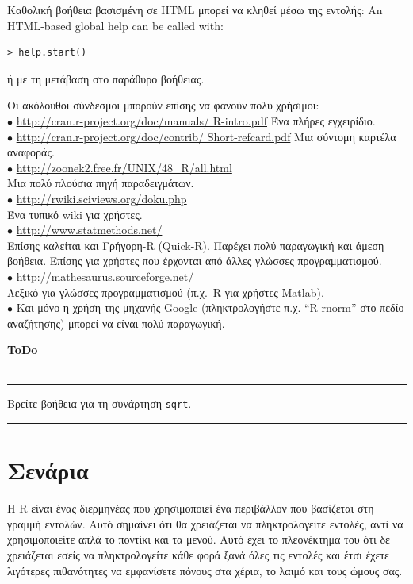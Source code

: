 \documentclass[a4paper,10pt,twocolumn]{article}
\newenvironment{ToDo} {
  \begin{flushright}
    \hfill
    \begin{minipage}{0.9\columnwidth}
    \textsf{\textbf{ToDo}} \\
      \vspace{-0.7cm}\\
      {\color{Gray}\rule[-0.05cm]{\columnwidth}{1.5pt}}} {
      {\color{Gray}\rule[0.3cm]{\columnwidth}{1.5pt}}
    \end{minipage}
    \vspace{0.3cm}
  \end{flushright}
  }
\begin{document}
Καθολική βοήθεια βασισμένη σε HTML μπορεί να κληθεί μέσω της εντολής:
An HTML-based global help can be called with:
\begin{Verbatim}[frame=single,gobble=0]
> help.start()
\end{Verbatim}
ή με τη μετάβαση στο παράθυρο βοήθειας.

Οι ακόλουθοι σύνδεσμοι μπορούν επίσης να φανούν πολύ χρήσιμοι:\\
\noindent $\bullet$ \url{http://cran.r-project.org/doc/manuals/ R-intro.pdf} Ένα πλήρες εγχειρίδιο.\\
\noindent $\bullet$ \url{http://cran.r-project.org/doc/contrib/ Short-refcard.pdf} Μια σύντομη καρτέλα
αναφοράς.\\
\noindent $\bullet$  \url{http://zoonek2.free.fr/UNIX/48\_R/all.html}\\
  Μια πολύ πλούσια πηγή παραδειγμάτων.\\
\noindent $\bullet$  \url{http://rwiki.sciviews.org/doku.php}\\
  Ένα τυπικό wiki για χρήστες.\\
\noindent $\bullet$ \url{http://www.statmethods.net/}\\
    Επίσης καλείται και Γρήγορη-R (Quick-R). Παρέχει πολύ παραγωγική και άμεση βοήθεια. Επίσης για χρήστες
    που έρχονται από άλλες γλώσσες προγραμματισμού. \\
    \noindent $\bullet$ \url{http://mathesaurus.sourceforge.net/}\\
    Λεξικό για γλώσσες προγραμματισμού (π.χ.~R για χρήστες Matlab). \\
\noindent $\bullet$  Και μόνο η χρήση της μηχανής Google (πληκτρολογήστε π.χ. ``R rnorm'' στο πεδίο αναζήτησης)
μπορεί να είναι πολύ παραγωγική.\\

\begin{ToDo}
Βρείτε βοήθεια για τη συνάρτηση \texttt{sqrt}.\\
\end{ToDo}


\section{Σενάρια}

Η R είναι ένας διερμηνέας που χρησιμοποιεί ένα περιβάλλον που βασίζεται στη γραμμή εντολών. Αυτό σημαίνει
ότι θα χρειάζεται να πληκτρολογείτε εντολές, αντί να χρησιμοποιείτε απλά το ποντίκι και τα μενού. Αυτό έχει
το πλεονέκτημα του ότι δε χρειάζεται εσείς να πληκτρολογείτε κάθε φορά ξανά όλες τις εντολές και έτσι έχετε
λιγότερες πιθανότητες να εμφανίσετε πόνους στα χέρια, το λαιμό και τους ώμους σας.
\end{document}
